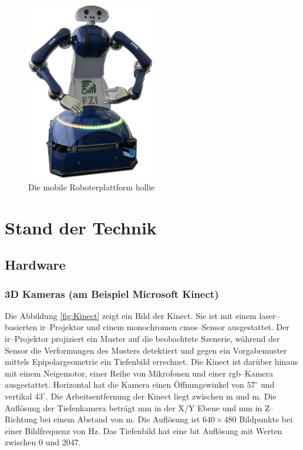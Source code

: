 \begin{figure}[h]
	\center
	\includegraphics[width=0.5\textwidth]{graphics/hollie}
	\caption{\label{fig:hollie} Die mobile Roboterplattform \gls{hollie}}
\end{figure}



\section{Stand der Technik}
\label{stand_der_technik_sec}
\authorsection{\editorabel}

\subsection{Hardware}

\subsubsection{3D Kameras (am Beispiel Microsoft Kinect)}
Die Abbildung \ref{fig:Kinect} zeigt ein Bild der Kinect.
Sie ist mit einem laser--basierten \gls{ir}--Projektor und einem monochromen \gls{cmos}--Sensor ausgestattet.
Der \gls{ir}--Projektor projiziert ein Muster auf die beobachtete Szenerie, während der  Sensor die Verformungen des Musters detektiert und gegen ein Vorgabemuster mittels Epipolargeometrie ein Tiefenbild errechnet.
Die Kinect ist darüber hinaus mit einem Neigemotor, einer Reihe von Mikrofonen und einer \gls{rgb}--Kamera ausgestattet.
Horizontal hat die Kamera einen Öffnungswinkel von $57^\circ$ und vertikal $43^\circ$.
Die Arbeitsentfernung der Kinect liegt zwischen \unit[0,8]{m} und \unit[3,5]{m}.
Die Auflösung der Tiefenkamera beträgt \unit[3]{mm} in der X/Y Ebene und \unit[10]{mm} in Z--Richtung bei einem Abstand von \unit[2]{m}.
Die Auflösung ist $640 \times 480$ Bildpunkte bei einer Bildfrequenz von \unit[30]{Hz}.
Das Tiefenbild hat eine \unit[11]{bit} Auflösung mit Werten zwischen 0 und 2047.

